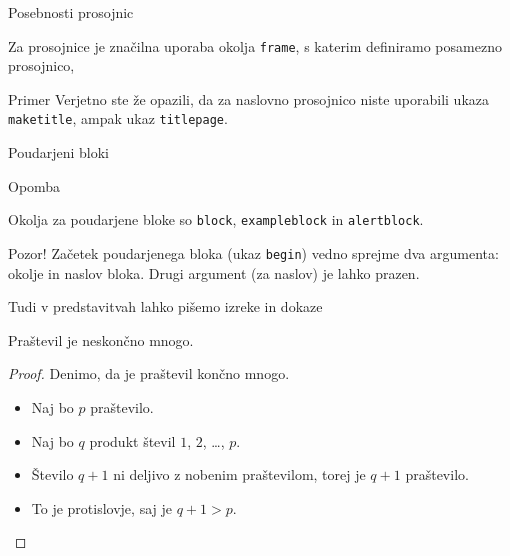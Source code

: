 \begin{frame}{Posebnosti prosojnic}

	Za prosojnice je značilna uporaba okolja \texttt{frame},
	s katerim definiramo posamezno prosojnico,
	\begin{exampleblock}{Primer}
		Verjetno ste že opazili, da za naslovno prosojnico niste uporabili
		ukaza \texttt{maketitle}, ampak ukaz \texttt{titlepage}.
	\end{exampleblock}
\end{frame}

\begin{frame}{Poudarjeni bloki}
	\begin{block}{Opomba}

		Okolja za poudarjene bloke so \texttt{block}, \texttt{exampleblock} in \texttt{alertblock}.
	\end{block}
    
	\begin{alertblock}{Pozor!}
		Začetek poudarjenega bloka (ukaz \texttt{begin}) vedno sprejme 
		dva argumenta: okolje in naslov bloka.
		Drugi argument (za naslov) je lahko prazen. 
	\end{alertblock}

\end{frame}

\begin{frame}{Tudi v predstavitvah lahko pišemo izreke in dokaze}

	\begin{izrek}
	   Praštevil je neskončno mnogo.
	\end{izrek}
	\begin{proof}
	   Denimo, da je praštevil končno mnogo.
	   \begin{itemize}
		  \item<+-> Naj bo \(p\)  praštevilo.
		  \item<+-> Naj bo \(q\) produkt števil \(1\), \(2\), \ldots, \(p\).
		  \item<+-> Število \(q+1\) ni deljivo z nobenim praštevilom, torej je \(q+1\) praštevilo.
		  \item<+-> To je protislovje, saj je \(q+1>p\). \qedhere
	   \end{itemize}
	\end{proof}
 \end{frame}
 
